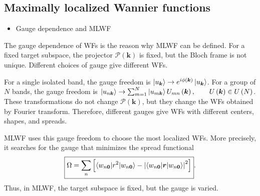 \documentclass[12pt, oneside]{article}
\newcommand{\p}[1]{\left(#1\right)}
\numberwithin{equation}{subsection}
\begin{document}
\subsection{Maximally localized Wannier functions}

\begin{itemize}
	\item Gauge dependence and MLWF
\end{itemize}

The gauge dependence of WFs is the reason why MLWF can be defined. For a fixed target subspace, the projector \(\mathcal{P}\p{\bm{k}}\) is fixed, but the Bloch frame is not unique. Different choices of gauge give different WFs.

For a single isolated band, the gauge freedom is \(\ket{u_{\bm{k}}}\rightarrow e^{i\phi\p{\bm{k}}}\ket{u_{\bm{k}}}\). For a group of \(N\) bands, the gauge freedom is \(\ket{u_{n\bm{k}}}\rightarrow \sum_{m=1}^{N}\ket{u_{m\bm{k}}}U_{mn}\p{\bm{k}},\qquad U\p{\bm{k}}\in U\p{N}\). These transformations do not change \(\mathcal{P}\p{\bm{k}}\), but they change the WFs obtained by Fourier transform. Therefore, different gauges give WFs with different centers, shapes, and spreads.

MLWF uses this gauge freedom to choose the most localized WFs. More precisely, it searches for the gauge that minimizes the spread functional
\begin{align}
	\boxed{
		\Omega=\sum_n\left[\braket{w_{n\bm{0}}|r^2|w_{n\bm{0}}}-\left|\braket{w_{n\bm{0}}|\bm{r}|w_{n\bm{0}}}\right|^2\right]
	}.
\end{align}
Thus, in MLWF, the target subspace is fixed, but the gauge is varied.


\section{}
\end{document}
